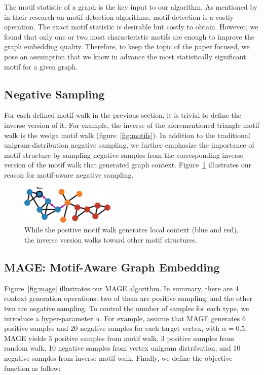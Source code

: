\documentclass[letterpaper]{article}
\begin{document}
            The motif statistic of a graph is the key input to our algorithm. As mentioned by \cite{motifdecrev} 
            in their research on motif detection algorithms, motif detection is a costly operation. The
            exact motif statistic is desirable but costly to obtain. However, we found that only one or 
            two most characteristic motifs are enough to improve the graph embedding quality. Therefore, 
            to keep the topic of the paper focused, we pose an assumption that we know in advance the most
            statistically significant motif for a given graph. 

        \subsection{Negative Sampling}

            For each defined motif walk in the previous section, it is trivial to define the inverse version
            of it. For example, the inverse of the aforementioned triangle motif walk is the wedge motif
            walk (figure~\ref{fig:motifs}). In addition to the traditional unigram-distribution negative
            sampling, we further emphasize the importance of motif structure by sampling negative samples
            from the corresponding inverse version of the motif walk that generated graph context. 
            Figure~\ref{fig:mneg} illustrates our reason for motif-aware negative sampling.

            \begin{figure}
                \centering
                \includegraphics[width=0.4\textwidth]{fig6_mneg}
                \caption{While the positive motif walk generates local context (blue and red), the inverse version walks toward other motif structures.}
                \label{fig:mneg}
            \end{figure}

        \subsection{MAGE: Motif-Aware Graph Embedding}

            Figure~\ref{fig:mage} illustrates our MAGE algorithm. In summary, 
            there are 4 context generation operations: two of them are positive sampling, and the other
            two are negative sampling. To control the number of samples for each type, we introduce a 
            hyper-parameter $\alpha$. For example, assume that MAGE generates 6 positive samples and 
            20 negative samples for each target vertex, with $\alpha=0.5$, MAGE yields 3 positive samples 
            from motif walk, 3 positive samples from random walk, 10 negative samples from vertex unigram
            distribution, and 10 negative samples from inverse motif walk.  Finally, we define the 
            objective function as follow:
\end{document}
